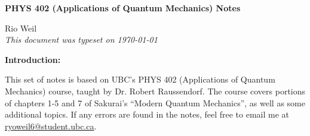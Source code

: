 \documentclass[10pt]{article}
\begin{document}
\begin{tcolorbox}
  \begin{center}
  \begin{Large}
    \textbf{PHYS 402 (Applications of Quantum Mechanics) Notes} \\
    \vspace{5pt}
  \end{Large}
  \begin{large}
        Rio Weil \\
\vspace{5pt}
    \emph{This document was typeset on \today}
  \end{large}
  \end{center}
\end{tcolorbox}

\begin{center}
  \textbf{Introduction:}

  This set of notes is based on UBC's PHYS 402 (Applications of Quantum Mechanics) course, taught by Dr. Robert Raussendorf. The course covers portions of chapters 1-5 and 7 of Sakurai's ``Modern Quantum Mechanics'', as well as some additional topics. If any errors are found in the notes, feel free to email me at \href{mailto:ryoweil6@student.ubc.ca}{ryoweil6@student.ubc.ca}.

\end{center}
\tableofcontents

\newpage


\newpage


\newpage


\newpage


\newpage


\newpage

\end{document}
